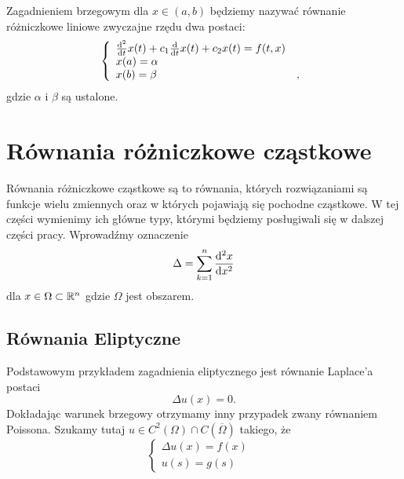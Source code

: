 \documentclass[12pt,a4paper]{report}
\begin{document}
\begin{problem}
Zagadnieniem brzegowym dla $ x \in (a,b) $ będziemy nazywać równanie różniczkowe liniowe zwyczajne rzędu dwa postaci:
\begin{equation}
\left\{\begin{array}{ll}
\ddx [^2]{t} x(t) + c_1\ddx{t} x(t) + c_2x(t) = f(t,x) & \\
x(a) = \alpha & \\
x(b) = \beta &,
\end{array} \right.
\end{equation}
gdzie $\alpha$ i $\beta$ są ustalone. 
\end{problem}
\section{Równania różniczkowe cząstkowe}
Równania różniczkowe cząstkowe są to równania, których rozwiązaniami są funkcje wielu zmiennych oraz w których pojawiają się pochodne cząstkowe. W tej części wymienimy ich główne typy, którymi będziemy  posługiwali się  w dalszej części pracy. Wprowadźmy oznaczenie 
$$
\Delta = \sum_{k=1}^{n} \ddx[{^2 x}]{x^2}  
$$
dla $ x \in \Omega \subset \setR^{n} $ gdzie $\Omega$ jest obszarem. 
\subsection{Równania Eliptyczne}
Podstawowym przykładem zagadnienia eliptycznego jest równanie Laplace'a postaci 
$$
\Delta u(x) = 0. 
$$
Dokładając warunek brzegowy otrzymamy inny przypadek zwany równaniem Poissona. Szukamy tutaj $u \in C^2(\Omega) \cap C(\overline{\Omega})$ takiego, że %
\begin{equation}
\left\{\begin{array}{ll}
\Delta u(x) = f(x) & \\
u(s) = g(s)&
\end{array} \right. 
\end{equation}
\end{document}
